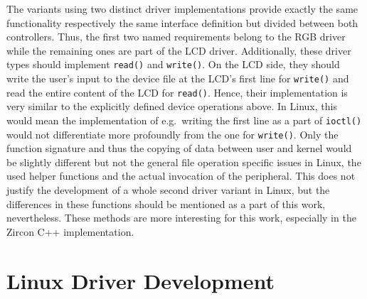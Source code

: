 The variants using two distinct driver implementations provide exactly the same functionality respectively the same interface definition but divided between both controllers.
Thus, the first two named requirements belong to the RGB driver while the remaining ones are part of the LCD driver.
Additionally, these driver types should implement \texttt{read()} and \texttt{write()}.
On the LCD side, they should write the user's input to the device file at the LCD's first line for \texttt{write()} and read the entire content of the LCD for \texttt{read()}.
Hence, their implementation is very similar to the explicitly defined device operations above.
In Linux, this would mean the implementation of e.g.\ writing the first line as a part of \texttt{ioctl()} would not differentiate more profoundly from the one for \texttt{write()}.
Only the function signature and thus the copying of data between user and kernel would be slightly different but not the general file operation specific issues in Linux, the used helper functions and the actual invocation of the peripheral.
This does not justify the development of a whole second driver variant in Linux, but the differences in these functions should be mentioned as a part of this work, nevertheless.
These methods are more interesting for this work, especially in the Zircon C++ implementation.


\section{Linux Driver Development}\label{sec:cs-linux}

